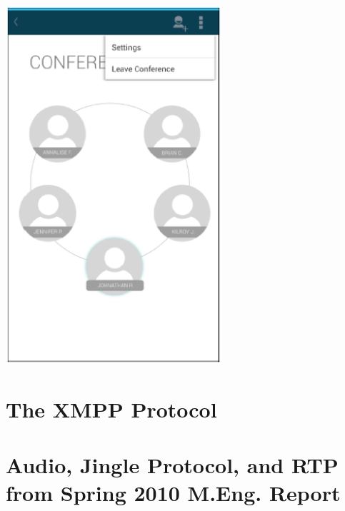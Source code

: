 \documentclass[12pt, letterpaper]{article}
\begin{document}
\begin{center}
\includegraphics[width=0.6\textwidth]{conference5.eps}

\clearpage
\section{The XMPP Protocol}

\clearpage
\section{Audio, Jingle Protocol, and RTP from Spring 2010 M.Eng. Report}
\end{center}
\end{document}
